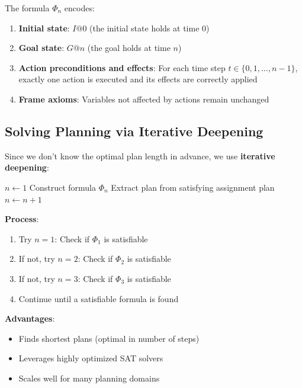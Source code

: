 \documentclass[11pt,a4paper]{article}
\theoremstyle{definition}
\theoremstyle{plain}
\theoremstyle{remark}
\begin{document}
The formula $\Phi_n$ encodes:
\begin{enumerate}
    \item \textbf{Initial state}: $I@0$ (the initial state holds at time 0)
    \item \textbf{Goal state}: $G@n$ (the goal holds at time $n$)
    \item \textbf{Action preconditions and effects}: For each time step $t \in \{0, 1, \dots, n-1\}$, exactly one action is executed and its effects are correctly applied
    \item \textbf{Frame axioms}: Variables not affected by actions remain unchanged
\end{enumerate}

\subsection{Solving Planning via Iterative Deepening}

Since we don't know the optimal plan length in advance, we use \textbf{iterative deepening}:

\begin{tcolorbox}[colback=yellow!10!white,colframe=yellow!75!black,title=\textbf{Iterative Deepening SAT Planning}]
\begin{algorithm}[H]
\caption{Planning via SAT with Iterative Deepening}
\begin{algorithmic}[1]
\STATE $n \leftarrow 1$
    \STATE Construct formula $\Phi_n$
        \STATE Extract plan from satisfying assignment
        \RETURN plan
    \ENDIF
    \STATE $n \leftarrow n + 1$
\ENDWHILE
\end{algorithmic}
\end{algorithm}
\end{tcolorbox}

\textbf{Process}:
\begin{enumerate}
    \item Try $n = 1$: Check if $\Phi_1$ is satisfiable
    \item If not, try $n = 2$: Check if $\Phi_2$ is satisfiable
    \item If not, try $n = 3$: Check if $\Phi_3$ is satisfiable
    \item Continue until a satisfiable formula is found
\end{enumerate}

\textbf{Advantages}:
\begin{itemize}
    \item Finds shortest plans (optimal in number of steps)
    \item Leverages highly optimized SAT solvers
    \item Scales well for many planning domains
\end{itemize}
\end{document}
